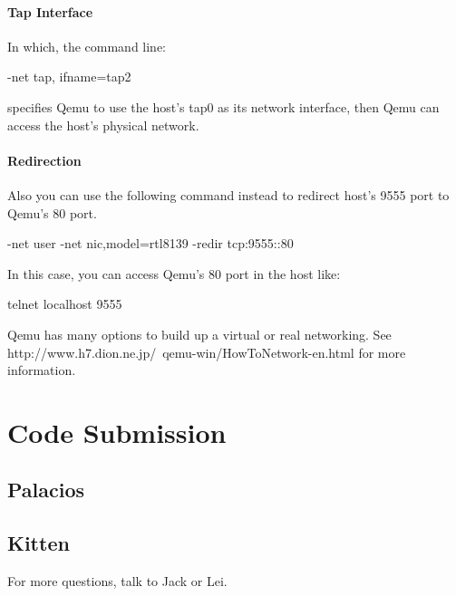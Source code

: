 \documentclass[11pt]{article}
\begin{document}
\paragraph*{Tap Interface}
In which, the command line: 

-net tap, ifname=tap2

specifies Qemu to use the host's tap0 as its network interface, then Qemu can access the host's physical network.

\paragraph*{Redirection}

Also you can use the following command instead to redirect host's 9555 port to Qemu's 80 port.

-net user -net nic,model=rtl8139  -redir tcp:9555::80

In this case, you can access Qemu's 80 port in the host like:

telnet localhost 9555

Qemu has many options to build up a virtual or real networking. See http://www.h7.dion.ne.jp/~qemu-win/HowToNetwork-en.html for more information.




\section{Code Submission}
\label{sec:submission}
\subsection{Palacios}

\subsection{Kitten}

For more questions, talk to Jack or Lei.
\end{document}
